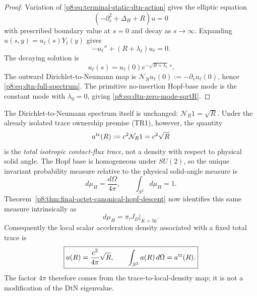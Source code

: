 \documentclass[12pt,a4paper]{article}
\begin{document}
\begin{proof}
Variation of \eqref{p8:eq:terminal-static-dtn-action} gives the elliptic equation
\begin{equation}
\label{p8:eq:terminal-static-elliptic}
 (-\partial_s^2+\Delta_H+R)u=0
\end{equation}
with prescribed boundary value at \(s=0\) and decay as \(s\to\infty\).  Expanding \(u(s,y)=u_\ell(s)Y_\ell(y)\) gives
\begin{equation}
 -u_\ell''+(R+\lambda_\ell)u_\ell=0 .
\end{equation}
The decaying solution is
\begin{equation}
 u_\ell(s)=u_\ell(0)e^{-\sqrt{R+\lambda_\ell}\,s} .
\end{equation}
The outward Dirichlet-to-Neumann map is \(\mathcal N_Ru_\ell(0):=-\partial_su_\ell(0)\), hence \eqref{p8:eq:dtn-full-spectrum}.  The primitive no-insertion Hopf-base mode is the constant mode with \(\lambda_0=0\), giving \eqref{p8:eq:dtn-zero-mode-sqrtR}.
\end{proof}

\begin{proposition}
\label{p8:prop:static-acceleration-readout}
The Dirichlet-to-Neumann spectrum itself is unchanged:
\(\mathcal N_R1=\sqrt R\).  Under the already isolated trace ownership
premise (TR1), however, the quantity
\begin{equation}
\label{p8:eq:primitive-total-accel-charge-derived}
 a^{\rm tr}(R):=c^2\mathcal N_R1=c^2\sqrt R
\end{equation}
is the \emph{total isotropic contact-flux trace}, not a density with respect
to physical solid angle.  The Hopf base is homogeneous under \(SU(2)\), so the
unique invariant probability measure relative to the physical solid-angle
measure is
\begin{equation}
\label{p8:eq:hopf-invariant-probability-measure}
 d\mu_H=\frac{d\Omega}{4\pi},
 \qquad \int_{S^2}d\mu_H=1.
\end{equation}
Theorem~\ref{p8:thm:final-octet-canonical-hopf-descent} now identifies this
same measure intrinsically as
\begin{equation}
 \label{p8:eq:rar-measure-as-terminal-dark-pushforward}
 \boxed{d\mu_H=\left.\pi_!J_D\right|_{K=56}}.
\end{equation}
Consequently the local scalar acceleration density associated with a fixed
total trace is
\begin{equation}
\label{p8:eq:primitive-acceleration-readout}
\boxed{
 a(R)=\frac{c^2}{4\pi}\sqrt R,
 \qquad
 \int_{S^2}a(R)\,d\Omega=a^{\rm tr}(R).
}
\end{equation}
The factor \(4\pi\) therefore comes from the trace-to-local-density map; it
is not a modification of the DtN eigenvalue.
\end{proposition}
\end{document}
